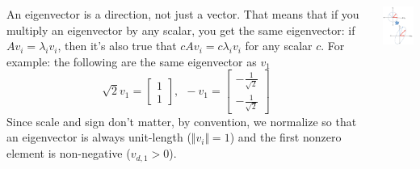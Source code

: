 \documentclass{beamer}
\begin{document}
\begin{frame}
  \begin{columns}[t]
    \column{2.75in}
    \begin{block}{}
        An eigenvector is a direction, not just a vector.  That means
        that if you multiply an eigenvector by any scalar, you get the
        same eigenvector: if $A{v}_i=\lambda_i{v}_i$, then it’s
        also true that $cA{v}_i=c\lambda_i{v}_i$ for any scalar $c$.
        For example: the following are the same eigenvector as ${v}_1$
        \[
        \sqrt{2}{v}_1=\left[\begin{array}{c}1\\1\end{array}\right],~~
        -{v}_1=\left[\begin{array}{c}-\frac{1}{\sqrt{2}}\\-\frac{1}{\sqrt{2}}\end{array}\right]
        \]
        Since scale and sign don't matter, by convention, we normalize so that 
        an eigenvector is always unit-length ($\Vert{v}_i\Vert=1$) and
        the first nonzero element is non-negative ($v_{d,1}>0$).
    \end{block}
    \column{1.5in}
    \begin{block}{}
      \includegraphics[width=1.45in]{linalg_review_fig2.png}
    \end{block}
  \end{columns}
\end{frame}
\end{document}

